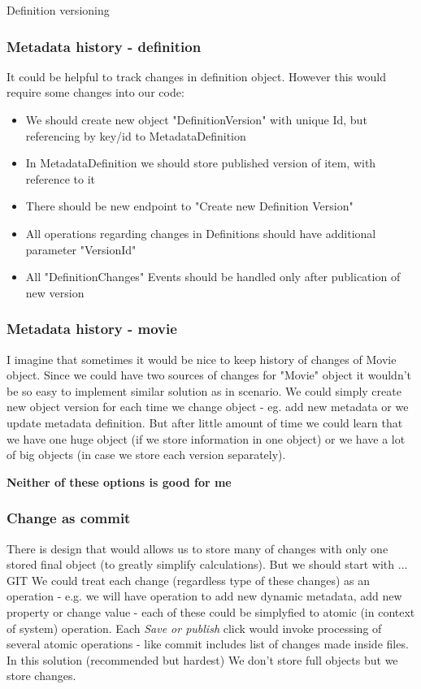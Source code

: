 \documentclass{beamer}
\begin{document}
\begin{section}{Definition versioning}
\begin{frame}
\frametitle{Metadata history - definition}
It could be helpful to track changes in definition object. However this would require some changes into our code: \pause
\begin{itemize}
	\item We should create new object "DefinitionVersion" with unique Id, but referencing by key/id to MetadataDefinition \pause
	\item In MetadataDefinition we should store published version of item, with reference to it \pause
	\item There should be new endpoint to "Create new Definition Version" \pause
	\item All operations regarding changes in Definitions should have additional parameter "VersionId" \pause
	\item All "DefinitionChanges" Events should be handled only after publication of new version \pause
\end{itemize}
\end{frame}

\begin{frame}
\frametitle{Metadata history - movie}
I imagine that sometimes it would be nice to keep history of changes of Movie object. Since we could have two sources of changes for "Movie" object it wouldn't be so easy to implement similar solution as in scenario. We could simply create new object version for each time we change object - eg. add new metadata or we update metadata definition. But after little amount of time we could learn that we have one huge object (if we store information in one object) or we have a lot of big objects (in case we store each version separately). \pause
\newline
\begin{center}
	\textbf{Neither of these options is good for me}
\end{center}
\end{frame}

\begin{frame}
\frametitle{Change as commit}
There is design that would allows us to store many of changes with only one stored final object (to greatly simplify calculations). \newline \pause
But we should start with  ...  \pause GIT \newline \pause
We could treat each change (regardless type of these changes) as an operation - e.g. we will have operation to add new dynamic metadata, add new property or change value - each of these could be simplyfied to atomic (in context of system) operation. \newline
Each \textit{Save or publish} click would invoke processing of several atomic operations - like commit includes list of changes made inside files.  \newline
In this solution (recommended but hardest) We don't store full objects but we store changes.
\end{frame}


\end{section}
\end{document}
